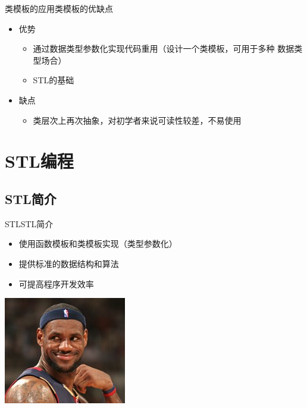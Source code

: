 \begin{frame}[t, fragile]{类模板的应用}{类模板的优缺点}%
  \begin{spacing}{1.8}
  \begin{itemize}
  \item 优势
    \begin{itemize}
    \item 通过数据类型参数化实现代码重用（设计一个类模板，可用于多种
      数据类型场合）
    \item STL的基础
    \end{itemize}
  \item 缺点
    \begin{itemize}
    \item 类层次上再次抽象，对初学者来说可读性较差，不易使用
    \end{itemize}
  \end{itemize}
  \end{spacing}
\end{frame}

\section[STL]{STL编程}\label{sec:chap07-sec03}
\subsection[简介]{STL简介}\label{sec:chap07-sec03-01}
\begin{frame}[t, fragile]{STL}{STL简介}%
  \begin{spacing}{1.8}
  \begin{itemize}
  \item 使用函数模板和类模板实现（类型参数化）
  \item 提供标准的数据结构和算法
  \item 可提高程序开发效率
  \end{itemize}
  \begin{center}
    \includegraphics[width=0.4\textwidth]{figure/chap07/02stl01}
  \end{center}
  \end{spacing}
\end{frame}

